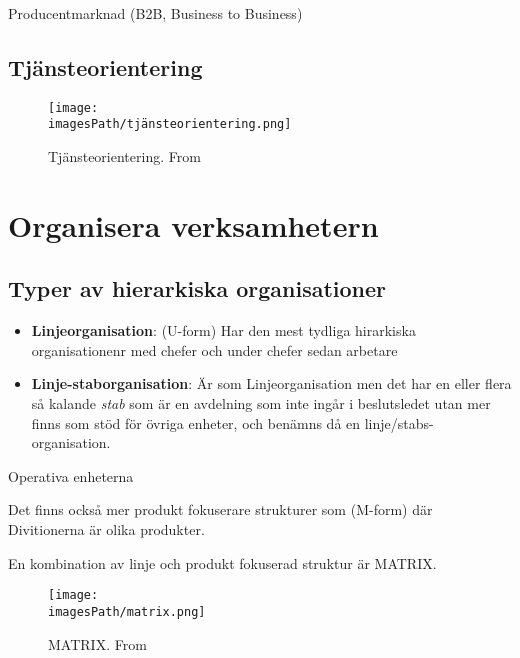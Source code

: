 \begin{multicols}{2}
Producentmarknad (B2B, Business to Business)
\end{multicols}
\raggedcolumns


\subsection{Tjänsteorientering}
\begin{figure}[H]
    \centering
    \texttt{[image: \\imagesPath/tjänsteorientering.png]}
    \caption{Tjänsteorientering. From \cite{im}}
\end{figure}


\section{Organisera verksamhetern}
\subsection{Typer av hierarkiska organisationer}
\begin{itemize}
    \item \textbf{Linjeorganisation}: (U-form) \newline
    Har den mest tydliga hirarkiska organisationenr med chefer och under chefer sedan arbetare
    \item \textbf{Linje-staborganisation}: \newline
    Är som Linjeorganisation men det har en eller flera så kalande \textit{stab} som 
    är en avdelning som inte ingår i beslutsledet utan mer finns som stöd för övriga enheter, och benämns
    då en linje/stabs-organisation.
\end{itemize}
Operativa enheterna

Det finns också mer produkt fokuserare strukturer som (M-form)
där Divitionerna är olika produkter.

En kombination av linje och produkt fokuserad struktur är MATRIX.
\begin{figure}[H]
    \centering
    \texttt{[image: \\imagesPath/matrix.png]}
    \caption{MATRIX. From \cite{im}}
\end{figure}


